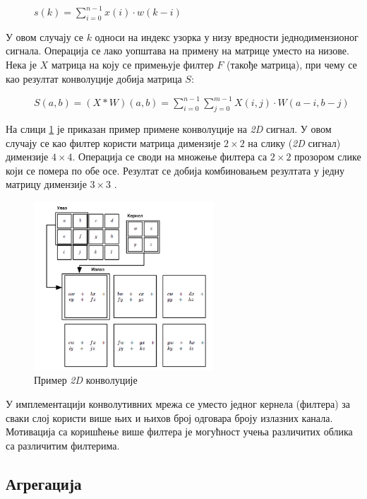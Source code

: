 \documentclass[11pt,oneside]{memoir}
\begin{document}
\begin{figure}[H]
  \centering
  $s(k) = \sum_{i=0}^{n-1} x(i)\cdot w(k-i)$
\end{figure}

У овом случају се $k$ односи на индекс узорка у низу вредности једнодимензионог сигнала. 
Операција се лако уопштава на примену на матрице уместо на низове. Нека је $X$ матрица на коју се примењује филтер $F$
(такође матрица), при чему се као резултат конволуције добија матрица $S$:

\begin{figure}[H]
  \centering
  $S(a, b) = (X*W)(a, b) = \sum_{i=0}^{n-1} \sum_{j=0}^{m-1} X(i, j) \cdot W(a-i, b-j)$
\end{figure}

На слици \ref{convolution} је приказан пример примене конволуције на \textit{2D} сигнал. У овом случају се као филтер користи
матрица димензије $2\times 2$ на слику (\textit{2D} сигнал) димензије $4\times 4$. Операција се своди на множење 
филтера са $2\times 2$ прозором слике који се помера по обе осе. Резултат се добија комбиновањем резултата
у једну матрицу димензије $3\times 3$ \cite{deep_learning_goodfellow}.

\begin{figure}[H]
  \centering
  \includegraphics[width=0.6\textwidth]{images/convolution.png}
  \caption{Пример \textit{2D} конволуције\label{convolution}}
\end{figure}

У имплементацији конволутивних мрежа се уместо једног кернела (филтера) за сваки слој користи више њих и њихов број одговара броју излазних канала.
Мотивација са коришћење више филтера је могућност учења различитих облика са различитим филтерима.

\subsection{Агрегација}
\end{document}
